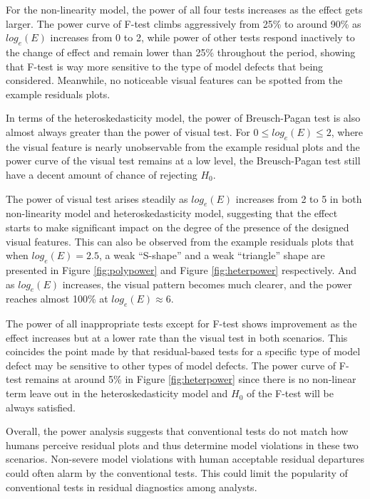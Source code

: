 \documentclass[]{interact}
\theoremstyle{plain}%
\theoremstyle{definition}
\theoremstyle{remark}
\begin{document}
For the non-linearity model, the power of all four tests increases as
the effect gets larger. The power curve of F-test climbs aggressively
from 25\% to around 90\% as \(log_e(E)\) increases from 0 to 2, while
power of other tests respond inactively to the change of effect and
remain lower than 25\% throughout the period, showing that F-test is way
more sensitive to the type of model defects that being considered.
Meanwhile, no noticeable visual features can be spotted from the example
residuals plots.

In terms of the heteroskedasticity model, the power of Breusch-Pagan
test is also almost always greater than the power of visual test. For
\(0 \leq log_e(E) \leq 2\), where the visual feature is nearly
unobservable from the example residual plots and the power curve of the
visual test remains at a low level, the Breusch-Pagan test still have a
decent amount of chance of rejecting \(H_0\).

The power of visual test arises steadily as \(log_e(E)\) increases from
2 to 5 in both non-linearity model and heteroskedasticity model,
suggesting that the effect starts to make significant impact on the
degree of the presence of the designed visual features. This can also be
observed from the example residuals plots that when \(log_e(E) = 2.5\),
a weak ``S-shape'' and a weak ``triangle'' shape are presented in Figure
\ref{fig:polypower} and Figure \ref{fig:heterpower} respectively. And as
\(log_e(E)\) increases, the visual pattern becomes much clearer, and the
power reaches almost 100\% at \(log_e(E) \approx 6\).

The power of all inappropriate tests except for F-test shows improvement
as the effect increases but at a lower rate than the visual test in both
scenarios. This coincides the point made by \citet{cook1982residuals}
that residual-based tests for a specific type of model defect may be
sensitive to other types of model defects. The power curve of F-test
remains at around 5\% in Figure \ref{fig:heterpower} since there is no
non-linear term leave out in the heteroskedasticity model and \(H_0\) of
the F-test will be always satisfied.

Overall, the power analysis suggests that conventional tests do not
match how humans perceive residual plots and thus determine model
violations in these two scenarios. Non-severe model violations with
human acceptable residual departures could often alarm by the
conventional tests. This could limit the popularity of conventional
tests in residual diagnostics among analysts.
\end{document}
